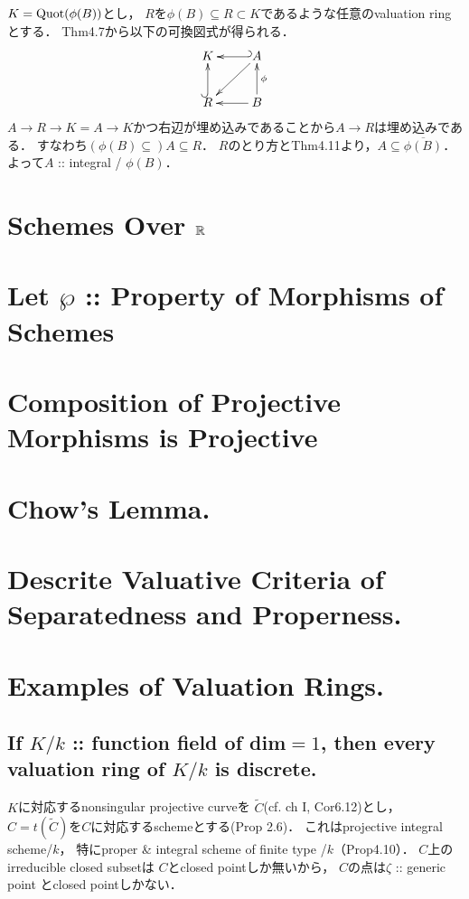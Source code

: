 \documentclass[a4paper]{jsarticle}
\begin{document}
    $K=\operatorname{Quot}(\phi(B))$とし，
    $R$を$\phi(B) \subseteq R \subset K$であるような任意のvaluation ringとする．
    Thm4.7から以下の可換図式が得られる．
    \[
    \xymatrix
    {
        K  & A \ar@{_{(}->}[l] \ar[ld]\\
        R  \ar@{^{(}->}[u]& B \ar[u]_-{\phi} \ar[l]
    }
    \]
    $A \to R \to K=A \to K$かつ右辺が埋め込みであることから$A \to R$は埋め込みである．
    すなわち$(\phi(B) \subseteq )A \subseteq R$．
    $R$のとり方とThm4.11より，$A \subseteq \overline{\phi(B)}$．
    よって$A$ :: integral / $\phi(B)$．

\section{Schemes Over $\mathbb{R}$} %

\section{Let $\wp$ :: Property of Morphisms of Schemes} %

\section{Composition of Projective Morphisms is Projective} %

\section{Chow's Lemma.} %

\section{Descrite Valuative Criteria of Separatedness and Properness.} %

\section{Examples of Valuation Rings.} %
    \subsection{If $K/k$ :: function field of dim$=1$, then every valuation ring of $K/k$ is discrete.}
    $K$に対応するnonsingular projective curveを
    $\tilde{C}$(cf. ch I, Cor6.12)とし，
    $C=t(\tilde{C})$を$C$に対応するschemeとする(Prop 2.6)．
    これはprojective integral scheme/$k$，
    特にproper \& integral scheme of finite type /$k$（Prop4.10）．
    $C$上のirreducible closed subsetは
    $C$とclosed pointしか無いから，
    $C$の点は$\zeta$ :: generic point とclosed pointしかない．
\end{document}
